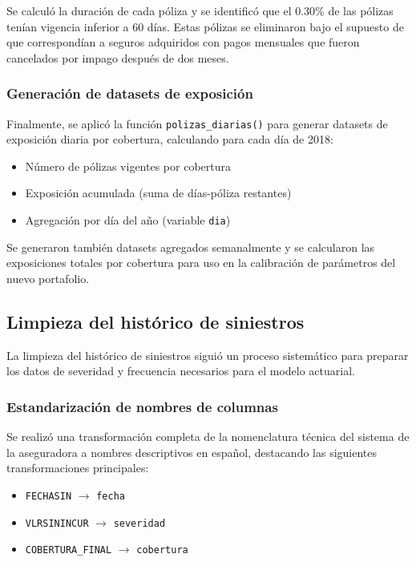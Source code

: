 Se calculó la duración de cada póliza y se identificó que el 0.30\% de las pólizas tenían vigencia inferior a 60 días. Estas pólizas se eliminaron bajo el supuesto de que correspondían a seguros adquiridos con pagos mensuales que fueron cancelados por impago después de dos meses.

\subsubsection{Generación de datasets de exposición}

Finalmente, se aplicó la función \texttt{polizas\_diarias()} para generar datasets de exposición diaria por cobertura, calculando para cada día de 2018:

\begin{itemize}
    \item Número de pólizas vigentes por cobertura
    \item Exposición acumulada (suma de días-póliza restantes)
    \item Agregación por día del año (variable \texttt{dia})
\end{itemize}

Se generaron también datasets agregados semanalmente y se calcularon las exposiciones totales por cobertura para uso en la calibración de parámetros del nuevo portafolio.

\subsection{Limpieza del histórico de siniestros}

La limpieza del histórico de siniestros siguió un proceso sistemático para preparar los datos de severidad y frecuencia necesarios para el modelo actuarial.

\subsubsection{Estandarización de nombres de columnas}

Se realizó una transformación completa de la nomenclatura técnica del sistema de la aseguradora a nombres descriptivos en español, destacando las siguientes transformaciones principales:

\begin{itemize}
    \item \texttt{FECHASIN} $\rightarrow$ \texttt{fecha}
    \item \texttt{VLRSININCUR} $\rightarrow$ \texttt{severidad}
    \item \texttt{COBERTURA\_FINAL} $\rightarrow$ \texttt{cobertura}
\end{itemize}

